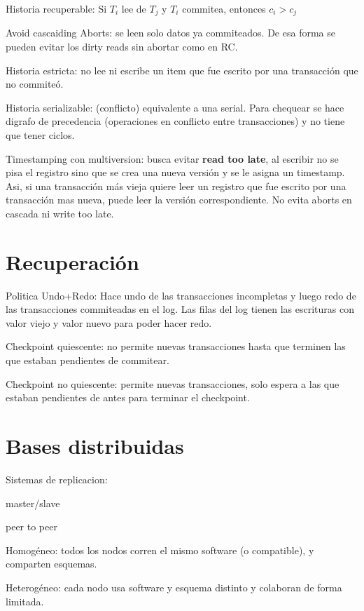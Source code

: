 Historia recuperable: Si $T_i$ lee de $T_j$ y $T_i$ commitea, entonces $c_i > c_j$

Avoid cascaiding Aborts: se leen solo datos ya commiteados. De esa forma se pueden evitar los dirty reads sin abortar como en RC.

Historia estricta: no lee ni escribe un item que fue escrito por una transacción que no commiteó.

Historia serializable: (conflicto) equivalente a una serial. Para chequear se hace digrafo de precedencia (operaciones en conflicto entre transacciones) y no tiene que tener ciclos.

Timestamping con multiversion: busca evitar \textbf{read too late}, al escribir no se pisa el registro sino que se crea una nueva versión y se le asigna un timestamp. Asi, si una transacción más vieja quiere leer un registro que fue escrito por una transacción mas nueva, puede leer la versión correspondiente. No evita aborts en cascada ni write too late.

\section{Recuperación}

Politica Undo+Redo: Hace undo de las transacciones incompletas y luego redo de las transacciones commiteadas en el log. Las filas del log tienen las escrituras con valor viejo y valor nuevo para poder hacer redo.

Checkpoint quiescente: no permite nuevas transacciones hasta que terminen las que estaban pendientes de commitear.

Checkpoint no quiescente: permite nuevas transacciones, solo espera a las que estaban pendientes de antes para terminar el checkpoint.

\section{Bases distribuidas}

Sistemas de replicacion:

master/slave

peer to peer

Homogéneo: todos los nodos corren el mismo software (o compatible), y comparten esquemas.

Heterogéneo: cada nodo usa software y esquema distinto y colaboran de forma limitada.
